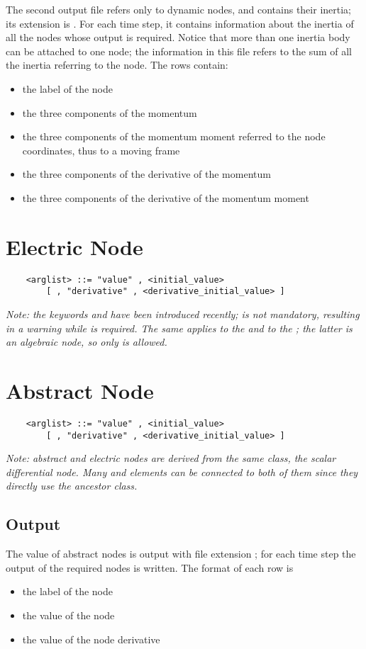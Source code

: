 \noindent
The second output file refers only to dynamic nodes, and contains their
inertia; its extension is .
For each time step, it contains information about the inertia of all the
nodes whose output is required.
Notice that more than one inertia body can be attached to one node; the
information in this file refers to the sum of all the inertia referring to
the node.
The rows contain:
\begin{itemize}
    \item the label of the node
    \item the three components of the momentum
    \item the three components of the momentum moment referred to the node
    coordinates, thus to a moving frame
    \item the three components of the derivative of the momentum
    \item the three components of the derivative of the momentum moment
\end{itemize}


\section{Electric Node}
\begin{verbatim}
    <arglist> ::= "value" , <initial_value> 
        [ , "derivative" , <derivative_initial_value> ]
\end{verbatim}
\emph{Note: the keywords  and 
have been introduced recently; is not mandatory,
resulting in a warning while  is required.
The same applies to the  
and to the ; the latter is an algebraic
node, so only  is allowed.
}





\section{Abstract Node}
\begin{verbatim}
    <arglist> ::= "value" , <initial_value>
        [ , "derivative" , <derivative_initial_value> ]
\end{verbatim}
{\em
    Note: abstract and electric nodes are derived from the same class, the
    scalar differential node. Many  and  elements 
    can be connected to both of them since they directly use the ancestor
    class. 
}

\subsection{Output}
The value of abstract nodes is output with file extension ; for
each time step the output of the required nodes is written.
The format of each row is
\begin{itemize}
    \item the label of the node
    \item the value of the node
    \item the value of the node derivative
\end{itemize}




